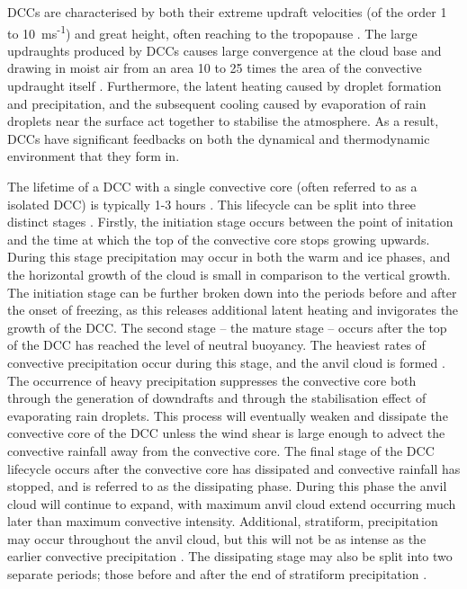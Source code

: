 DCCs are characterised by both their extreme updraft velocities (of the order 1 to 10~ms\textsuperscript{-1}) and great height, often reaching to the tropopause \citep{weisman_mesoscale_2015}.
The large updraughts produced by DCCs causes large convergence at the cloud base and drawing in moist air from an area 10 to 25 times the area of the convective updraught itself \citep{trenberth_changing_2003}.
Furthermore, the latent heating caused by droplet formation and precipitation, and the subsequent cooling caused by evaporation of rain droplets near the surface act together to stabilise the atmosphere.
As a result, DCCs have significant feedbacks on both the dynamical and thermodynamic environment that they form in.

The lifetime of a DCC with a single convective core (often referred to as a isolated DCC) is typically 1-3 hours \citep{chen_diurnal_1997}.
This lifecycle can be split into three distinct stages \citep{wall_life_2018}.
Firstly, the initiation stage occurs between the point of initation and the time at which the top of the convective core stops growing upwards.
During this stage precipitation may occur in both the warm and ice phases, and the horizontal growth of the cloud is small in comparison to the vertical growth.
The initiation stage can be further broken down into the periods before and after the onset of freezing, as this releases additional latent heating and invigorates the growth of the DCC.
The second stage -- the mature stage -- occurs after the top of the DCC has reached the level of neutral buoyancy.
The heaviest rates of convective precipitation occur during this stage, and the anvil cloud is formed \citep{houze_chapter_2014}.
The occurrence of heavy precipitation suppresses the convective core both through the generation of downdrafts and through the stabilisation effect of evaporating rain droplets.
This process will eventually weaken and dissipate the convective core of the DCC unless the wind shear is large enough to advect the convective rainfall away from the convective core.
The final stage of the DCC lifecycle occurs after the convective core has dissipated and convective rainfall has stopped, and is referred to as the dissipating phase.
During this phase the anvil cloud will continue to expand, with maximum anvil cloud extend occurring much later than maximum convective intensity.
Additional, stratiform, precipitation may occur throughout the anvil cloud, but this will not be as intense as the earlier convective precipitation \citep{houze_chapter_2014}.
The dissipating stage may also be split into two separate periods; those before and after the end of stratiform precipitation \citep{wall_life_2018}.

